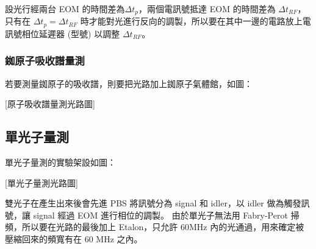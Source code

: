 \documentclass[class=NCU_thesis, crop=false]{standalone}
\begin{document}
設光行經兩台 EOM 的時間差為$\Delta t_{p}$，兩個電訊號抵達 EOM 的時間差為 $\Delta t_{RF}$，只有在 $\Delta t_{p}=\Delta t_{RF}$ 時才能對光進行反向的調製，所以要在其中一邊的電路放上電訊號相位延遲器 (型號) 以調整 $\Delta t_{RF}$。

\subsubsection{銣原子吸收譜量測}
若要測量銣原子的吸收譜，則要把光路加上銣原子氣體館，如圖：

[原子吸收譜量測光路圖]

\subsection{單光子量測}
單光子量測的實驗架設如圖：

[單光子量測光路圖]

雙光子在產生出來後會先進 PBS 將訊號分為 signal 和 idler，以 idler 做為觸發訊號，讓 signal 經過 EOM 進行相位的調製。
由於單光子無法用 Fabry-Perot 掃頻，所以要在光路的最後加上 Etalon，只允許 60MHz 內的光通過，用來確定被壓縮回來的頻寬有在 60 MHz 之內。
\end{document}
